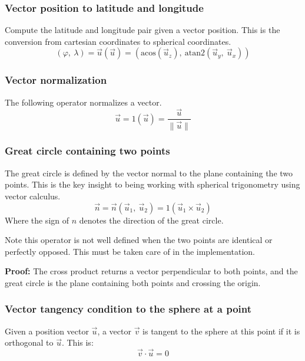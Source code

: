 \subsubsection{Vector position to latitude and longitude}
Compute the latitude and longitude pair given a vector position. This is the conversion from cartesian coordinates to spherical coordinates.
\begin{equation}
    (\varphi, \ \lambda) = \vec{u} (\vec{u}) =
    \left(
        \text{acos} (\vec{u}_z), \
        \text{atan2} (\vec{u}_y, \ \vec{u}_x)
    \right)
\end{equation}

\subsubsection{Vector normalization}
The following operator normalizes a vector.
\begin{equation}
    \vec{u} = \text{1} (\vec{u}) = \frac{\vec{u}}{\|\vec{u}\|}
\end{equation}

\subsubsection{Great circle containing two points}
The great circle is defined by the vector normal to the plane containing the two points. This is the key insight to being working with spherical trigonometry using vector calculus.
\begin{equation}
    \vec{n} = \vec{n} (\vec{u}_1, \ \vec{u}_2) = 1\left( \vec{u}_1 \times \vec{u}_2 \right)
\end{equation}
Where the sign of $n$ denotes the direction of the great circle.

Note this operator is not well defined when the two points are identical or perfectly opposed. This must be taken care of in the implementation.

\textbf{{Proof:}}
The cross product returns a vector perpendicular to both points, and the great circle is the plane containing both points and crossing the origin.

\subsubsection{Vector tangency condition to the sphere at a point}
Given a position vector $\vec{u}$, a vector $\vec{v}$ is tangent to the sphere at this point if it is orthogonal to $\vec{u}$. This is:
\begin{equation}
    \vec{v} \cdot \vec{u} = 0
\end{equation}

